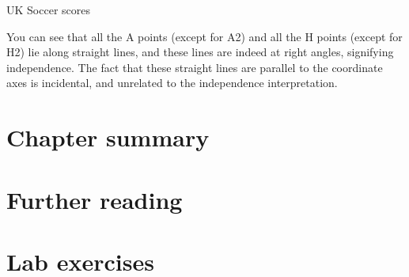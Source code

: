 \documentclass[11pt]{book}
\renewenvironment{knitrout}{\small\renewcommand{\baselinestretch}{.85}}{} %
\begin{document}
\begin{Example}[soccer3]{UK Soccer scores}
\begin{knitrout}
\begin{kframe}
\begin{alltt}
\hlstd{(} \hlstd{=}\hlstd{,} \hlstd{=}\hlstd{)}
\hlstd{(} \hlstd{=}\hlstd{,} \hlstd{=}\hlstd{)}
\hlstd{(}\hlstd{=}\hlstd{,} \hlstd{=}\hlstd{,} \hlstd{=}\hlstd{)}
\hlstd{(}\hlstd{=}\hlstd{,} \hlstd{=}\hlstd{,} \hlstd{=}\hlstd{)}
\end{alltt}
\end{kframe}
\end{knitrout}

You can see that all the A points (except for A2) and all the H points (except for H2) lie along straight lines, and these lines are indeed at right angles,
signifying independence.
The fact that these straight lines are parallel to the coordinate axes is
incidental, and unrelated to the independence interpretation.

\end{Example}


\section{Chapter summary}\label{sec:ca-summary}


\section{Further reading}\label{sec:ca-reading}

\section{Lab exercises}\label{sec:ca-lab}
\end{document}

